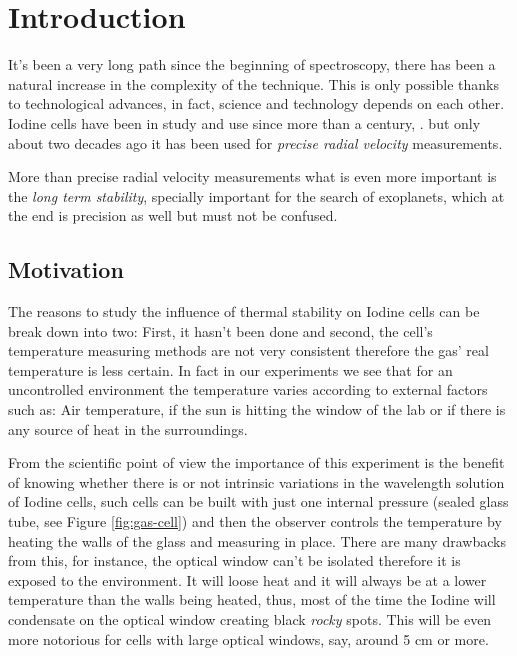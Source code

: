 \documentclass[master,       %
               twoside,        %
               BCOR10mm,       %
               ngerman,english  %
               ]{GAUBM_astro}
\begin{document}
\mainmatter   %

\chapter{Introduction}
It's been a very long path since the beginning of spectroscopy, there has been 
a natural increase in the complexity of the technique.
This is only possible thanks to technological advances, in fact, science 
and technology depends on each other. Iodine cells have been in study
and use since more than a century, \cite{evans1910}. but only about two 
decades ago it has been used for \emph{precise radial velocity} measurements.

More than precise radial velocity measurements what is even more important is 
the \emph{long term stability}, specially important for the search of 
exoplanets, which at the end is precision as well but must not be confused.



\section{Motivation}
The reasons to study the influence of thermal stability on Iodine cells can be 
break down into two: First, it hasn't been done and second, the cell's 
temperature measuring methods are not very consistent therefore the gas' real 
temperature is less certain. In fact in our experiments we see that for an 
uncontrolled environment the temperature varies according to external factors 
such as: Air temperature, if the sun is hitting the window of the lab or if 
there is any source of heat in the surroundings.

From the scientific point of view the importance of this experiment is the 
benefit of knowing whether there is or not intrinsic variations in the 
wavelength solution of Iodine cells, such cells can be built with just one 
internal pressure (sealed glass tube, see Figure \ref{fig:gas-cell}) and then 
the observer controls the temperature by heating the walls of the glass and 
measuring in place. There are many drawbacks from this, for instance, the 
optical window can't be isolated therefore it is exposed to the environment. It 
will loose heat and it will always be at a lower temperature than the 
walls being heated, thus, most of the time the Iodine will condensate on the 
optical window creating black \emph{rocky} spots. This will be even more 
notorious for cells with large optical windows, say, around 5 cm or more.
\end{document}
